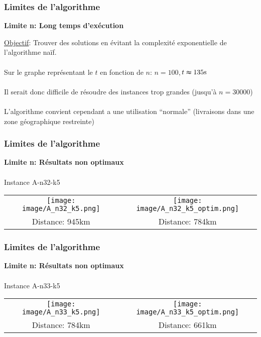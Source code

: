 \documentclass[10pt]{beamer}
\begin{document}
	\begin{frame}
		\frametitle{Limites de l'algorithme}
		\begin{center}
			\textbf{Limite n: Long temps d'exécution}
		\end{center}
		\underline{Objectif}: Trouver des solutions en évitant la complexité exponentielle de l'algorithme naïf. \\ \  \\
		Sur le graphe représentant le \( t \) en fonction de \( n \): \( n = 100, \)\quad \( t \thickapprox 135\text{s} \) \  \\ \  \\
		Il serait donc difficile de résoudre des instances trop grandes (jusqu'à \( n = 30000 \)) \\ \  \\
		L'algorithme convient cependant a une utilisation ``normale'' (livraisons dans une zone géographique restreinte)
	\end{frame}

	\begin{frame}
		\frametitle{Limites de l'algorithme}
		\begin{center}
			\textbf{Limite n: Résultats non optimaux} 
			\  \\ 
			\  \\
			Instance A-n32-k5 
			\begin{tabular}{c c}
				\texttt{[image: image/A\_n32\_k5.png]} & \texttt{[image: image/A\_n32\_k5\_optim.png]} \\
				Distance: 945km & Distance: 784km
			\end{tabular}
		\end{center}	
	\end{frame}
	
	\begin{frame}
		\frametitle{Limites de l'algorithme}	
		\begin{center}
			\textbf{Limite n: Résultats non optimaux} 
			\  \\
			\  \\
			Instance A-n33-k5
			\begin{tabular}{c c}
				\texttt{[image: image/A\_n33\_k5.png]} & \texttt{[image: image/A\_n33\_k5\_optim.png]} \\
				Distance: 784km & Distance: 661km
			\end{tabular}
		\end{center}
	\end{frame}
\end{document}
